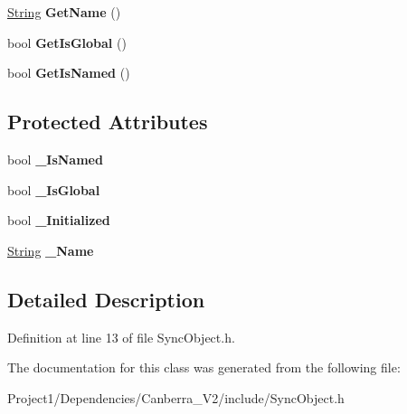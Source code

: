 \begin{DoxyCompactItemize}
\hyperlink{class_canberra_1_1_utility_1_1_core_1_1_string}{String} {\bfseries Get\+Name} ()
\item 
\mbox{\label{class_canberra_1_1_utility_1_1_core_1_1_sync_object_afa1bef8c30c3e1f85eda57c7bab72b06}} 
bool {\bfseries Get\+Is\+Global} ()
\item 
\mbox{\label{class_canberra_1_1_utility_1_1_core_1_1_sync_object_a6ad6f6802cf9fa85552164ef0185a815}} 
bool {\bfseries Get\+Is\+Named} ()
\end{DoxyCompactItemize}
\subsection*{Protected Attributes}
\begin{DoxyCompactItemize}
\item 
\mbox{\label{class_canberra_1_1_utility_1_1_core_1_1_sync_object_a9a44373c6ab8ce73cbe373e64ec03c77}} 
bool {\bfseries \+\_\+\+Is\+Named}
\item 
\mbox{\label{class_canberra_1_1_utility_1_1_core_1_1_sync_object_aeca23ab46d8c77eb0a279386bd395fbc}} 
bool {\bfseries \+\_\+\+Is\+Global}
\item 
\mbox{\label{class_canberra_1_1_utility_1_1_core_1_1_sync_object_ae73fa76babd0fa3918c3724b044a2a48}} 
bool {\bfseries \+\_\+\+Initialized}
\item 
\mbox{\label{class_canberra_1_1_utility_1_1_core_1_1_sync_object_a52c2b77c2ceb04ea1fb0461d59e67633}} 
\hyperlink{class_canberra_1_1_utility_1_1_core_1_1_string}{String} {\bfseries \+\_\+\+Name}
\end{DoxyCompactItemize}


\subsection{Detailed Description}


Definition at line 13 of file Sync\+Object.\+h.



The documentation for this class was generated from the following file\+:\begin{DoxyCompactItemize}
\item 
Project1/\+Dependencies/\+Canberra\+\_\+\+V2/include/Sync\+Object.\+h\end{DoxyCompactItemize}
